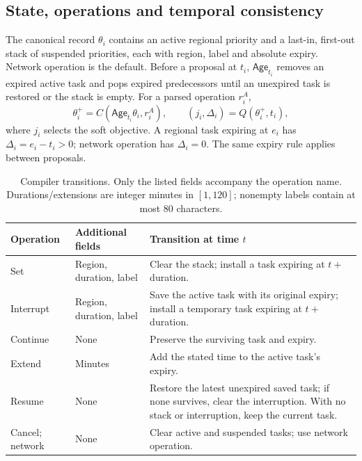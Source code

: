 \documentclass[preprint,12pt]{elsarticle}
\numberwithin{equation}{section}
\begin{document}
\subsection{State, operations and temporal consistency}

The canonical record $\theta_i$ contains an active regional priority and a
last-in, first-out stack of suspended priorities, each with region, label and
absolute expiry. Network operation is the default. Before a proposal at $t_i$,
$\mathsf{Age}_{t_i}$ removes an expired active task and pops expired predecessors until
an unexpired task is restored or the stack is empty. For a parsed operation
$r_i^A$,
\begin{equation}
 \theta_i^+=C(\mathsf{Age}_{t_i}\theta_i,r_i^A),\qquad
 (j_i,\Delta_i)=Q(\theta_i^+,t_i),
 \label{supp:detail:eq:task-state-compiler}
\end{equation}
where $j_i$ selects the soft objective. A regional task expiring at $e_i$
has $\Delta_i=e_i-t_i>0$; network operation has $\Delta_i=0$.
The same expiry rule applies between proposals.

\begin{table}[t]
\centering\small
\caption{Compiler transitions. Only the listed fields accompany the operation
name. Durations/extensions are integer minutes in $[1,120]$; nonempty labels
contain at most 80 characters.}
\label{supp:detail:tab:task-state-operations}
\begin{tabular}{@{}p{}p{}p{}@{}}
\toprule
Operation & Additional fields & Transition at time $t$\\
\midrule
Set & Region, duration, label & Clear the stack; install a task expiring at
$t+$ duration.\\
Interrupt & Region, duration, label & Save the active task with its original
expiry; install a temporary task expiring at $t+$ duration.\\
Continue & None & Preserve the surviving task and expiry.\\
Extend & Minutes & Add the stated time to the active task's expiry.\\
Resume & None & Restore the latest unexpired saved task; if none survives,
clear the interruption. With no stack or interruption, keep the current task.\\
Cancel; network & None & Clear active and suspended tasks; use network operation.\\
\bottomrule
\end{tabular}
\end{table}
\end{document}
